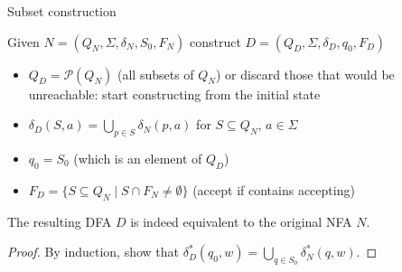 \documentclass[handout]{beamer}
\begin{document}
\begin{frame}{Subset construction}

    Given $N=(Q_N,\Sigma,\delta_N,S_0,F_N)$ construct $D=(Q_D,\Sigma,\delta_D,q_0,F_D)$

    \begin{itemize}
        \item \alert{$Q_D={\mathcal P}(Q_N)$} (all subsets of $Q_N$) or discard those that would be unreachable: start constructing from the initial state
        \item \alert{$\delta_D(S,a)=\bigcup_{p \in S}\delta_N(p,a)$} for $S\subseteq Q_N$, $a\in \Sigma$ 
        \item \alert{$q_0=S_0$} (which is an element of $Q_D$)
        \item \alert{$F_D=\{S\subseteq Q_N \mid S \cap F_N \neq \emptyset\}$} (accept if contains accepting)
    \end{itemize}

    \begin{theorem}
        The resulting DFA $D$ is indeed equivalent to the original NFA $N$.
    \end{theorem}

    \begin{proof}
        By induction, show that $\delta^*_D(q_0,w)=\bigcup_{q\in S_0}\delta^*_N(q,w)$.
    \end{proof}

\end{frame}
    
\end{document}
